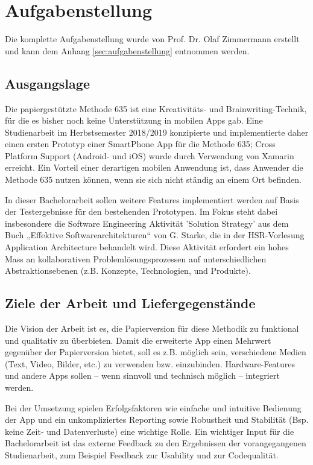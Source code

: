 
\thispagestyle{empty}
\section*{Aufgabenstellung}
Die komplette Aufgabenstellung wurde von Prof. Dr. Olaf Zimmermann erstellt und kann dem Anhang \ref{sec:aufgabenstellung} entnommen werden.

\subsection*{Ausgangslage}
Die papiergestützte Methode 635 ist eine Kreativitäts- und Brainwriting-Technik, für die es bisher noch keine Unterstützung in mobilen Apps gab. Eine Studienarbeit im Herbstsemester 2018/2019 konzipierte und implementierte daher einen ersten Prototyp einer SmartPhone App für die Methode 635; Cross Platform Support (Android- und iOS) wurde durch Verwendung von Xamarin erreicht. Ein Vorteil einer derartigen mobilen Anwendung ist, dass Anwender die Methode 635 nutzen können, wenn sie sich nicht ständig an einem Ort befinden. 


In dieser Bachelorarbeit sollen weitere Features implementiert werden auf Basis der Testergebnisse für den bestehenden Prototypen. Im Fokus steht dabei insbesondere die Software Engineering Aktivität 'Solution Strategy' aus dem Buch „Effektive Softwarearchitekturen“ von G. Starke, die in der HSR-Vorlesung Application Architecture behandelt wird. Diese Aktivität erfordert ein hohes Mass an kollaborativen Problemlösungsprozessen auf unterschiedlichen Abstraktionsebenen (z.B. Konzepte, Technologien, und Produkte). 

\subsection*{Ziele der Arbeit und Liefergegenstände}\label{subsec:ziele}
Die Vision der Arbeit ist es, die Papierversion für diese Methodik zu funktional und qualitativ zu überbieten. Damit die erweiterte App einen Mehrwert gegenüber der Papierversion bietet, soll es z.B. möglich sein, verschiedene Medien (Text, Video, Bilder, etc.) zu verwenden bzw. einzubinden. Hardware-Features und andere Apps sollen – wenn sinnvoll und technisch möglich – integriert werden.

Bei der Umsetzung spielen Erfolgsfaktoren wie einfache und intuitive Bedienung der App und ein unkompliziertes Reporting sowie Robustheit und Stabilität (Bsp. keine Zeit- und Datenverluste) eine wichtige Rolle. Ein wichtiger Input für die Bachelorarbeit ist das externe Feedback zu den Ergebnissen der vorangegangenen Studienarbeit, zum Beispiel Feedback zur Usability und zur Codequalität.

